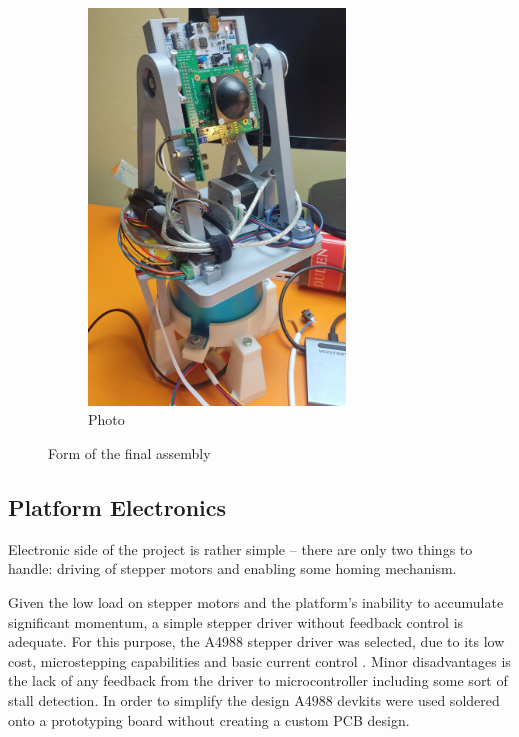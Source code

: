 \begin{figure}[h!]
\begin{subfigure}[b]{0.45\textwidth}
    \includegraphics[width=0.75\textwidth]{../img/assembly_photo.jpg} %
    \caption{Photo}
  \end{subfigure}
  \caption{Form of the final assembly}
  \label{fig:side_by_side}
\end{figure}


\subsection{Platform Electronics}

Electronic side of the project is rather simple -- there are only two things to handle: driving of stepper motors and enabling some homing mechanism.

Given the low load on stepper motors and the platform's inability to accumulate significant momentum, a simple stepper driver without feedback control is adequate.
For this purpose, the A4988 stepper driver was selected, due to its low cost, microstepping capabilities and basic current control \cite{a4988}.
Minor disadvantages is the lack of any feedback from the driver to microcontroller including some sort of stall detection.
In order to simplify the design A4988 devkits were used soldered onto a prototyping board without creating a custom PCB design.

